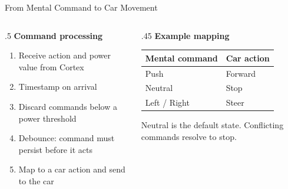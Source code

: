 \documentclass[aspectratio=169,11pt]{beamer}
\begin{document}
\begin{frame}{From Mental Command to Car Movement}
  \begin{columns}[T]
    \begin{column}{.5\textwidth}
      \textbf{Command processing}\par\smallskip
      \begin{enumerate}
        \item Receive action and power value from Cortex
        \item Timestamp on arrival
        \item Discard commands below a power threshold
        \item Debounce: command must persist before it acts
        \item Map to a car action and send to the car
      \end{enumerate}
    \end{column}
    \begin{column}{.45\textwidth}
      \textbf{Example mapping}\par\smallskip
      \begin{tabular}{@{}ll@{}}
        \toprule
        Mental command & Car action \\
        \midrule
        Push    & Forward \\
        Neutral & Stop \\
        Left / Right & Steer \\
        \bottomrule
      \end{tabular}
      \medskip

      {\footnotesize\color{muted}Neutral is the default state. Conflicting commands resolve to stop.}
    \end{column}
  \end{columns}
\end{frame}
\end{document}
